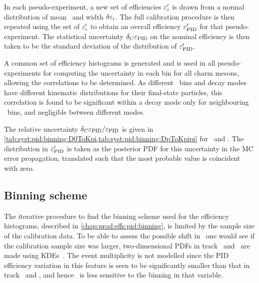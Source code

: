 In each pseudo-experiment, a new set of efficiencies $\varepsilon_{i}'$ is drawn from a 
normal distribution of mean \effi\ and width $\delta{\ensuremath{\varepsilon_{i}}}$.
The full calibration procedure is then repeated using the set of $\varepsilon_{i}'$ to 
obtain an overall efficiency $\varepsilon_{\textnormal{PID}}'$ for that pseudo-experiment.
The statistical uncertainty $\delta_{C}{\varepsilon_{\textnormal{PID}}}$ on the nominal efficiency is 
then taken to be the standard deviation of the distribution of $\varepsilon_{\textnormal{PID}}'$.

A common set of efficiency histograms is generated and is used in all 
pseudo-experiments for computing the uncertainty in each bin for all charm 
mesons, allowing the correlations to be determined.
As different \pTy\ bins and decay modes have different kinematic distributions 
for their final-state particles, this correlation is found to be significant 
within a decay mode only for neighbouring \pTy\ bins, and negligible between 
different modes.

The relative uncertainty $\delta_{C}{\varepsilon_{\textnormal{PID}}}/\varepsilon_{\textnormal{PID}}$ is given in 
\cref{tab:syst:pid:binning:D0ToKpi,tab:syst:pid:binning:DpToKpipi} for 
\DzToKpi\ and \DpToKpipi.
The distribution in $\varepsilon_{\textnormal{PID}}'$ is taken as the posterior \ac{PDF} for this 
uncertainty in the \ac{MC} error propagation, translated such that the most 
probable value is coincident with zero.

\subsection{Binning scheme}
\label{chap:prod:syst:pid:binning}

The iterative procedure to find the binning scheme used for the efficiency 
histograms, described in \cref{chap:prod:effs:pid:binning}, is limited by the 
sample size of the calibration data.
To be able to assess the possible shift in \effpid\ one would see if the 
calibration sample size was larger, two-dimensional \acp{PDF} in track \ptot\ 
and \Eta\ are made using \acp{KDE}~\cite{Poluektov:2014rxa}.
The event multiplicity is not modelled since the \ac{PID} efficiency variation 
in this feature is seen to be significantly smaller than that in track \ptot\ 
and \Eta, and hence \effpid\ is less sensitive to the binning in that variable.

